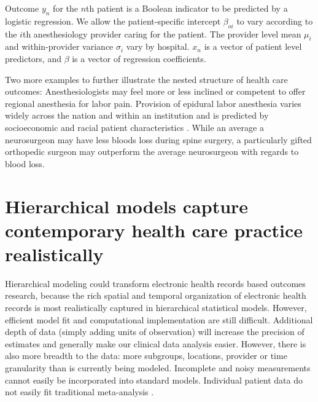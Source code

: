 \documentclass[11pt,notitlepage]{article}
\begin{document}
Outcome $y_n$ for the $n$th patient is a Boolean indicator to be predicted by a logistic regression. We allow the patient-specific
intercept $\beta_{oi}$ to vary according to the $i$th anesthesiology provider caring for the patient. The provider level mean 
$\mu_i$ and within-provider variance $\sigma_i$ vary by hospital. $x_n$ is a vector of patient level predictors, and $\beta$ is a vector 
of regression coefficients.  

Two more examples to further 
illustrate the nested structure of health care outcomes: 
Anesthesiologists may feel more or less inclined or competent to offer 
regional anesthesia for labor pain. Provision of epidural labor 
anesthesia varies widely across the nation and within an institution and 
is predicted by socioeconomic and racial patient characteristics 
\cite{Rust2004,Glance2007}.  
While an average a neurosurgeon may have less bloods loss during spine 
surgery, a particularly gifted orthopedic surgeon may outperform the 
average neurosurgeon with regards to blood loss.

\section*{Hierarchical models capture contemporary health care practice realistically}
Hierarchical modeling could transform electronic health records based 
outcomes research, because the rich spatial and temporal 
organization of electronic health records is most realistically 
captured in hierarchical statistical models. However, efficient model 
fit and computational implementation are still difficult.  
Additional depth of data (simply adding units of observation) will increase 
the precision of estimates and generally make our clinical data analysis easier. 
However, there is also more breadth to the data: 
more subgroups, locations, provider or time granularity than is currently 
being modeled. Incomplete and noisy 
measurements cannot easily be incorporated into standard models. 
Individual patient data do not easily fit traditional meta-analysis
\cite{Andreae2015,Andreae2012}.
\end{document}
